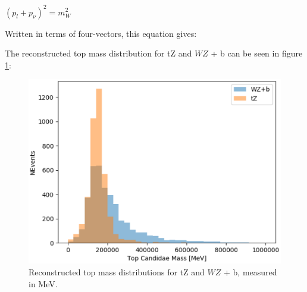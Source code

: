 \documentclass[NOTE, atlasdraft=true, texlive=2016, UKenglish]{\ATLASLATEXPATH atlasdoc}
\begin{document}
\begin{center}
   $(p_l + p_{\nu})^2 = m_W^2$ \\ 
\end{center} 

Written in terms of four-vectors, this equation gives:

The reconstructed top mass distribution for tZ and $WZ$ + b can be seen in figure \ref{fig:topMass}:

\begin{figure}[H]
    \centering
    \includegraphics[width=0.7\linewidth]{tZ_bdt/topMass.eps}
    \caption{Reconstructed top mass distributions for tZ and $WZ$ + b, measured in MeV.}
    \label{fig:topMass}
\end{figure}


\fi

\clearpage
\end{document}
